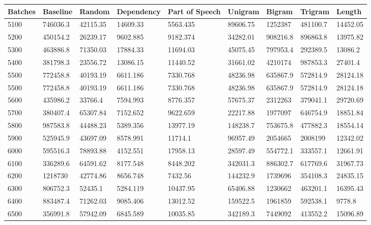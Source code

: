 \documentclass [11pt, proquest] {uwthesis}[2020/12/20]
\begin{document}
\begin{table}
\begin{tiny}
\centering
\begin{tabular}{|l|l|l|l|l|l|l|l|l|}
\hline
Batches & Baseline & Random & Dependency & Part of Speech & Unigram & Bigram & Trigram & Length \\ \hline
5100 & 746036.3 & 42115.35 & 14609.33 & 5563.435 & 89606.75 & 1252387 & 481100.7 & 14452.05 \\ \hline
5200 & 450154.2 & 26239.17 & 9602.885 & 9182.374 & 34282.01 & 908216.8 & 896863.8 & 13975.82 \\ \hline
5300 & 463886.8 & 71350.03 & 17884.33 & 11694.03 & 45075.45 & 797953.4 & 292389.5 & 13086.2 \\ \hline
5400 & 381798.3 & 23556.72 & 13086.15 & 11440.52 & 31661.02 & 4210174 & 987853.3 & 27401.4 \\ \hline
5500 & 772458.8 & 40193.19 & 6611.186 & 7330.768 & 48236.98 & 635867.9 & 572814.9 & 28124.18 \\ \hline
5500 & 772458.8 & 40193.19 & 6611.186 & 7330.768 & 48236.98 & 635867.9 & 572814.9 & 28124.18 \\ \hline
5600 & 435986.2 & 33766.4 & 7594.993 & 8776.357 & 57675.37 & 2312263 & 379041.1 & 29720.69 \\ \hline
5700 & 380407.4 & 65307.84 & 7152.652 & 9622.659 & 22217.88 & 1977097 & 646754.9 & 18851.84 \\ \hline
5800 & 987583.8 & 44488.23 & 5389.356 & 13977.19 & 148238.7 & 753675.8 & 477882.3 & 18554.14 \\ \hline
5900 & 525945.9 & 43697.09 & 8578.991 & 11714.1 & 96957.49 & 2054665 & 2008199 & 12342.02 \\ \hline
6000 & 595516.3 & 78893.88 & 4152.551 & 17958.13 & 28597.49 & 554772.1 & 333557.1 & 12661.91 \\ \hline
6100 & 336289.6 & 64591.62 & 8177.548 & 8448.202 & 342031.3 & 886302.7 & 617769.6 & 31967.73 \\ \hline
6200 & 1218730 & 42774.86 & 8656.748 & 7432.56 & 144232.9 & 1739696 & 354108.3 & 24835.15 \\ \hline
6300 & 806752.3 & 52435.1 & 5284.119 & 10437.95 & 65406.88 & 1230662 & 463201.1 & 16395.43 \\ \hline
6400 & 883487.4 & 71262.03 & 9085.406 & 13012.52 & 159522.5 & 1961859 & 592538.1 & 9778.8 \\ \hline
6500 & 356991.8 & 57942.09 & 6845.589 & 10035.85 & 342189.3 & 7449092 & 413552.2 & 15096.89 \\ \hline

\end{tabular}
\end{tiny}
\end{table}
\end{document}
